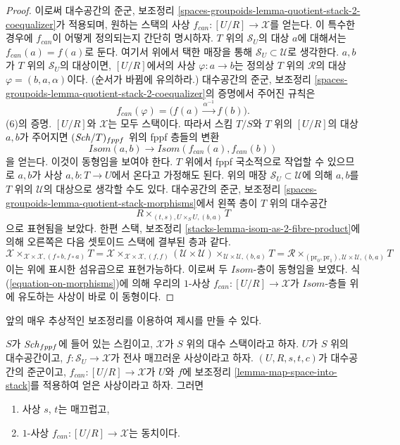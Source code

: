 \begin{proof}
\medskip\noindent
이로써 대수공간의 준군, 보조정리
\ref{spaces-groupoids-lemma-quotient-stack-2-coequalizer}가 적용되며, 원하는
스택의 사상 $f_{can} : [U/R] \to \mathcal{X}$를 얻는다. 이 특수한 경우에
$f_{can}$이 어떻게 정의되는지 간단히 명시하자. $T$ 위의
$\mathcal{S}_U$의 대상 $a$에 대해서는 $f_{can}(a) = f(a)$로 둔다. 여기서
위에서 택한 매장을 통해 $\mathcal{S}_U \subset \mathcal{U}$로 생각한다.
$a, b$가 $T$ 위의 $\mathcal{S}_U$의 대상이면, $[U/R]$에서의 사상
$\varphi : a \to b$는 정의상 $T$ 위의 $\mathcal{R}$의 대상
$\varphi = (b, a, \alpha)$이다. (순서가 바뀜에 유의하라.) 대수공간의
준군, 보조정리
\ref{spaces-groupoids-lemma-quotient-stack-2-coequalizer}의 증명에서 주어진
규칙은
\begin{equation}
\label{equation-on-morphisms}
f_{can}(\varphi) = \Big(f(a) \xrightarrow{\alpha^{-1}} f(b)\Big).
\end{equation}
(6)의 증명. $[U/R]$와 $\mathcal{X}$는 모두 스택이다. 따라서 스킴 $T/S$와
$T$ 위의 $[U/R]$의 대상 $a, b$가 주어지면 $(\mathit{Sch}/T)_{fppf}$ 위의 fppf
층들의 변환
$$
\mathit{Isom}(a, b) \longrightarrow \mathit{Isom}(f_{can}(a), f_{can}(b))
$$
을 얻는다. 이것이 동형임을 보여야 한다. $T$ 위에서 fppf 국소적으로
작업할 수 있으므로 $a, b$가 사상 $a, b : T \to U$에서 온다고 가정해도
된다. 위의 매장 $\mathcal{S}_U \subset \mathcal{U}$에 의해 $a, b$를 $T$
위의 $\mathcal{U}$의 대상으로 생각할 수도 있다. 대수공간의 준군,
보조정리 \ref{spaces-groupoids-lemma-quotient-stack-morphisms}에서 왼쪽 층이
$T$ 위의 대수공간
$$
R \times_{(t, s), U \times_S U, (b, a)} T
$$
으로 표현됨을 보았다. 한편 스택, 보조정리
\ref{stacks-lemma-isom-as-2-fibre-product}에 의해 오른쪽은 다음 셋토이드
스택에 결부된 층과 같다.
$$
\mathcal{X}
\times_{\mathcal{X} \times \mathcal{X}, (f \circ b, f \circ a)} T =
\mathcal{X}
\times_{\mathcal{X} \times \mathcal{X}, (f, f)}
(\mathcal{U} \times \mathcal{U})
\times_{\mathcal{U} \times \mathcal{U}, (b, a)} T =
\mathcal{R}
\times_{(\text{pr}_0, \text{pr}_1), \mathcal{U} \times \mathcal{U}, (b, a)} T
$$
이는 위에 표시한 섬유곱으로 표현가능하다. 이로써 두
$\mathit{Isom}$-층이 동형임을 보였다. 식
(\ref{equation-on-morphisms})에 의해 우리의 $1$-사상
$f_{can} : [U/R] \to \mathcal{X}$가 $\mathit{Isom}$-층들 위에 유도하는
사상이 바로 이 동형이다.
\end{proof}

\noindent
앞의 매우 추상적인 보조정리를 이용하여 제시를 만들 수 있다.

\begin{lemma}
\label{lemma-stack-presentation}
$S$가 $\mathit{Sch}_{fppf}$에 들어 있는 스킴이고, $\mathcal{X}$가 $S$ 위의 대수
스택이라고 하자. $U$가 $S$ 위의 대수공간이고,
$f : \mathcal{S}_U \to \mathcal{X}$가 전사 매끄러운 사상이라고 하자.
$(U, R, s, t, c)$가 대수공간의 준군이고,
$f_{can} : [U/R] \to \mathcal{X}$가 $U$와 $f$에 보조정리
\ref{lemma-map-space-into-stack}를 적용하여 얻은 사상이라고 하자. 그러면
\begin{enumerate}
\item 사상 $s$, $t$는 매끄럽고,
\item $1$-사상 $f_{can} : [U/R] \to \mathcal{X}$는 동치이다.
\end{enumerate}
\end{lemma}

